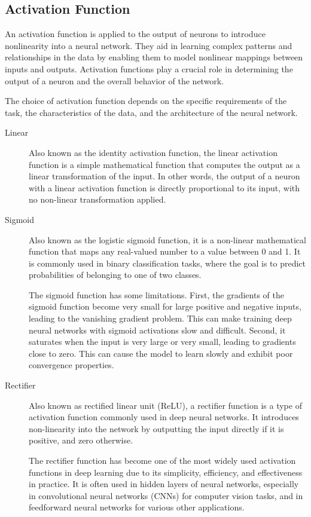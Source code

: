\documentclass[a4paper]{report}
\begin{document}
\subsection*{Activation Function}
An activation function is applied to the output of neurons to introduce nonlinearity into a neural network. They aid in learning complex patterns and relationships in the data by enabling them to model nonlinear mappings between inputs and outputs. Activation functions play a crucial role in determining the output of a neuron and the overall behavior of the network. 

The choice of activation function depends on the specific requirements of the task, the characteristics of the data, and the architecture of the neural network.

\begin{description}
\item[Linear]
Also known as the identity activation function, the linear activation function is a simple mathematical function that computes the output as a linear transformation of the input. In other words, the output of a neuron with a linear activation function is directly proportional to its input, with no non-linear transformation applied.

\item[Sigmoid]
Also known as the logistic sigmoid function, it is a non-linear mathematical function that maps any real-valued number to a value between 0 and 1. It is commonly used in binary classification tasks, where the goal is to predict probabilities of belonging to one of two classes.

The sigmoid function has some limitations. First, the gradients of the sigmoid function become very small for large positive and negative inputs, leading to the vanishing gradient problem. This can make training deep neural networks with sigmoid activations slow and difficult. Second, it saturates when the input is very large or very small, leading to gradients close to zero. This can cause the model to learn slowly and exhibit poor convergence properties.

\item[Rectifier]
Also known as rectified linear unit (ReLU), a rectifier function is a type of activation function commonly used in deep neural networks. It introduces non-linearity into the network by outputting the input directly if it is positive, and zero otherwise.

The rectifier function has become one of the most widely used activation functions in deep learning due to its simplicity, efficiency, and effectiveness in practice. It is often used in hidden layers of neural networks, especially in convolutional neural networks (CNNs) for computer vision tasks, and in feedforward neural networks for various other applications.


\end{description}
\end{document}
